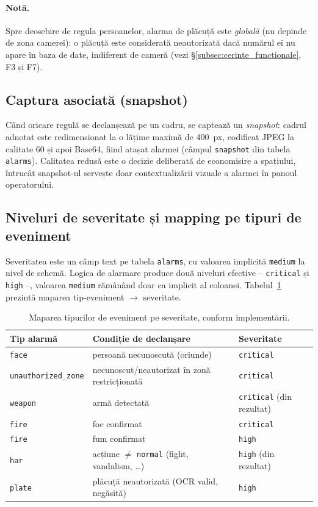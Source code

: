 \documentclass[../../main.tex]{subfiles}
\begin{document}
\paragraph*{Notă.} Spre deosebire de regula persoanelor, alarma de plăcuță este \emph{globală} (nu depinde de zona camerei): o plăcuță este considerată neautorizată dacă numărul ei nu apare în baza de date, indiferent de cameră (vezi \S\ref{subsec:cerinte_functionale}, F3 și F7).

\subsection{Captura asociată (snapshot)}

Când oricare regulă se declanșează pe un cadru, se captează un \emph{snapshot}: cadrul adnotat este redimensionat la o lățime maximă de 400~px, codificat JPEG la calitate 60 și apoi Base64, fiind atașat alarmei (câmpul \texttt{snapshot} din tabela \texttt{alarms}). Calitatea redusă este o decizie deliberată de economisire a spațiului, întrucât snapshot-ul servește doar contextualizării vizuale a alarmei în panoul operatorului.

\subsection{Niveluri de severitate și mapping pe tipuri de eveniment}

Severitatea este un câmp text pe tabela \texttt{alarms}, cu valoarea implicită \texttt{medium} la nivel de schemă. Logica de alarmare produce două niveluri efective -- \texttt{critical} și \texttt{high} --, valoarea \texttt{medium} rămânând doar ca implicit al coloanei. Tabelul~\ref{tab:alarm_mapping} prezintă maparea tip-eveniment $\rightarrow$ severitate.

\begin{table}[h]
\centering
\caption{Maparea tipurilor de eveniment pe severitate, conform implementării.}
\label{tab:alarm_mapping}
\begin{tabularx}{\textwidth}{l>{\raggedright\arraybackslash}Xl}
\hline
\textbf{Tip alarmă} & \textbf{Condiție de declanșare} & \textbf{Severitate} \\
\hline
\texttt{face} & persoană necunoscută (oriunde) & \texttt{critical} \\
\texttt{unauthorized\_zone} & necunoscut/neautorizat în zonă restricționată & \texttt{critical} \\
\texttt{weapon} & armă detectată & \texttt{critical} (din rezultat) \\
\texttt{fire} & foc confirmat & \texttt{critical} \\
\texttt{fire} & fum confirmat & \texttt{high} \\
\texttt{har} & acțiune $\neq$ \texttt{normal} (fight, vandalism, \dots) & \texttt{high} (din rezultat) \\
\texttt{plate} & plăcuță neautorizată (OCR valid, negăsită) & \texttt{high} \\
\hline
\end{tabularx}
\end{table}
\end{document}
